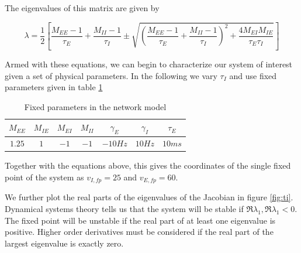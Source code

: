 \documentclass{article}
\begin{document}
The eigenvalues of this matrix are given by

\begin{equation}
\lambda = \dfrac{1}{2}[\dfrac{M_{EE}-1}{\tau_E}+\dfrac{M_{II}-1}{\tau_I} \pm \sqrt{(\dfrac{M_{EE}-1}{\tau_E}+\dfrac{M_{II}-1}{\tau_I})^2 + \dfrac{4M_{EI}M_{IE}}{\tau_E \tau_I}}]
\end{equation}

Armed with these equations, we can begin to characterize our system of interest given a set of physical parameters.
In the following we vary $\tau_I$ and use fixed parameters given in table \ref{tab:paramsnet}

\begin{table}[h]
\centering
\begin{tabular}{ |c|c|c|c|c|c|c|}
\hline
 $M_{EE}$ & $M_{IE}$ & $M_{EI}$ & $M_{II}$ & $\gamma_E$ & $\gamma_I$ & $\tau_E$\\
\hline
$1.25$ & $1$ & $-1$ & $-1$ & $-10 Hz$ & $10 Hz$ & $10 ms$\\
\hline
\end{tabular}
\caption{Fixed parameters in the network model}
\label{tab:paramsnet}
\end{table}

Together with the equations above, this gives the coordinates of the single fixed point of the system as $v_{I,fp} = 25$ and $v_{E,fp} = 60$. 

We further plot the real parts of the eigenvalues of the Jacobian in figure \ref{fig:ti}. Dynamical systems theory tells us that the system will be stable if $\Re{\lambda_1}, \Re{\lambda_1} < 0$. The fixed point will be unstable if the real part of at least one eigenvalue is positive. Higher order derivatives must be considered if the real part of the largest eigenvalue is exactly zero.
%
%
%
%
\end{document}
